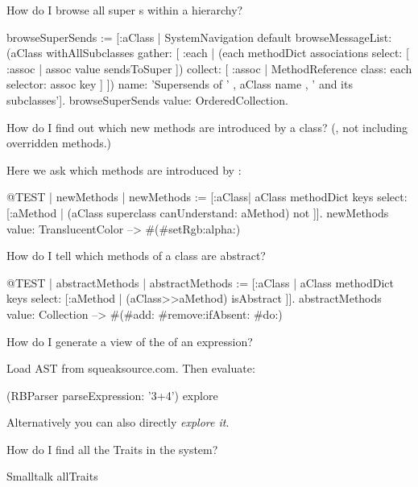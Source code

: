 \documentclass[a4paper,10pt,twoside]{book}
\begin{document}
\begin{faq}
How do I browse all super s within a hierarchy?
\end{faq}
\answer
\begin{code}{}
browseSuperSends := [:aClass | SystemNavigation default
	browseMessageList: (aClass withAllSubclasses gather: [ :each |
		(each methodDict associations
			select: [ :assoc | assoc value sendsToSuper ])
				collect: [ :assoc | MethodReference class: each selector: assoc key ] ])
	name: 'Supersends of ' , aClass name , ' and its subclasses'].
browseSuperSends value: OrderedCollection.
\end{code}

\begin{faq}
How do I find out which new methods are introduced by a class?
(\ie, not including overridden methods.)
\end{faq}
\answer
Here we ask which methods are introduced by :
\begin{code}{@TEST | newMethods |}
newMethods := [:aClass| aClass methodDict keys select:
	[:aMethod | (aClass superclass canUnderstand: aMethod) not ]].
newMethods value: TranslucentColor --> #(#setRgb:alpha:)
\end{code}

\begin{faq}
How do I tell which methods of a class are abstract?
\end{faq}
\answer
\begin{code}{@TEST | abstractMethods |}
abstractMethods :=
	[:aClass | aClass methodDict keys select:
		[:aMethod | (aClass>>aMethod) isAbstract ]].
abstractMethods value: Collection --> #(#add: #remove:ifAbsent: #do:)
\end{code}

\begin{faq}
How do I generate a view of the  of an expression?
\end{faq}
\answer
Load AST from squeaksource.com. Then evaluate:
\begin{code}{}
(RBParser parseExpression: '3+4') explore
\end{code}
Alternatively you can also directly \emph{explore it}.

\begin{faq}
How do I find all the Traits in the system?
\end{faq}
\answer
\begin{code}{}
Smalltalk allTraits
\end{code}
\end{document}
